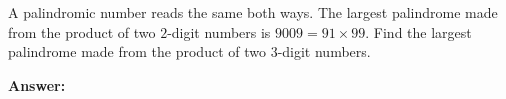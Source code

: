\documentclass{experimento}
\begin{document}
A palindromic number reads the same both ways. The largest palindrome made from the product
of two $2$-digit numbers is $9009 = 91 \times 99$.
Find the largest palindrome made from the product of two $3$-digit numbers.\par

\textbf{Answer:} \par
\end{document}
